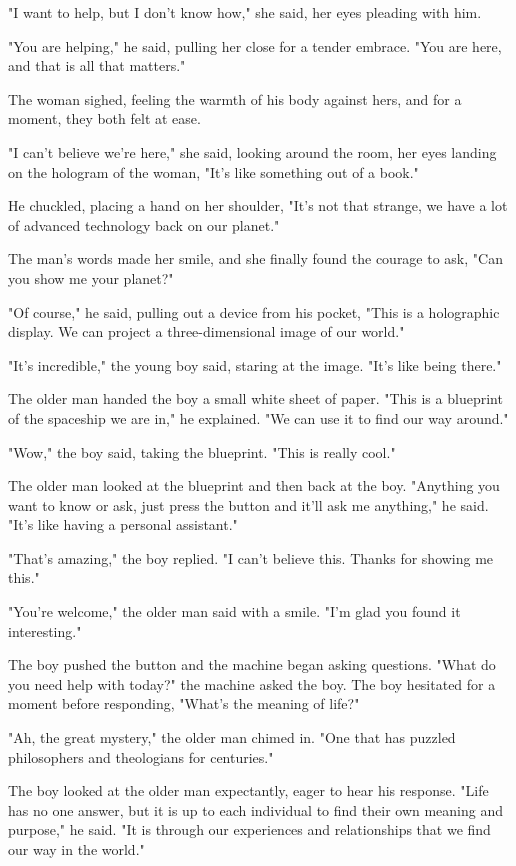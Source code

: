 \documentclass[smalldemyvopaper,11pt,twoside,onecolumn,openright,extrafontsizes]{memoir}
\begin{document}
"I want to help, but I don't know how," she said, her eyes pleading with him.\par
"You are helping," he said, pulling her close for a tender embrace. "You are here, and that is all that matters."\par
The woman sighed, feeling the warmth of his body against hers, and for a moment, they both felt at ease.\par
"I can't believe we're here," she said, looking around the room, her eyes landing on the hologram of the woman, "It's like something out of a book."\par
He chuckled, placing a hand on her shoulder, "It's not that strange, we have a lot of advanced technology back on our planet."\par
The man's words made her smile, and she finally found the courage to ask, "Can you show me your planet?"\par
"Of course," he said, pulling out a device from his pocket, "This is a holographic display. We can project a three-dimensional image of our world."\par
"It's incredible," the young boy said, staring at the image. "It's like being there."\par
The older man handed the boy a small white sheet of paper. "This is a blueprint of the spaceship we are in," he explained. "We can use it to find our way around."\par
"Wow," the boy said, taking the blueprint. "This is really cool."\par
The older man looked at the blueprint and then back at the boy. "Anything you want to know or ask, just press the button and it'll ask me anything," he said. "It's like having a personal assistant."\par
"That's amazing," the boy replied. "I can't believe this. Thanks for showing me this."\par
"You're welcome," the older man said with a smile. "I'm glad you found it interesting."\par
The boy pushed the button and the machine began asking questions. "What do you need help with today?" the machine asked the boy. The boy hesitated for a moment before responding, "What's the meaning of life?"\par
"Ah, the great mystery," the older man chimed in. "One that has puzzled philosophers and theologians for centuries."\par
The boy looked at the older man expectantly, eager to hear his response. "Life has no one answer, but it is up to each individual to find their own meaning and purpose," he said. "It is through our experiences and relationships that we find our way in the world."\par
\end{document}
